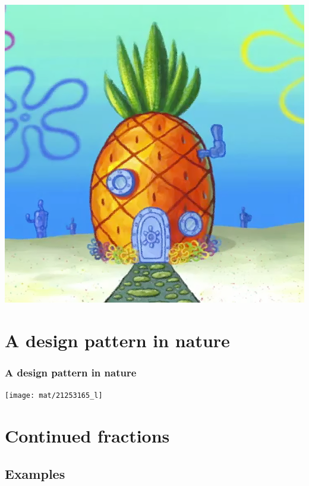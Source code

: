 \documentclass[12pt,compress,english,utf8,t]{beamer}
\begin{document}
{\begin{center}
    \includegraphics[height=0.25\textheight]{spongebob-ananas}
  \end{center}
}


\section{A design pattern in nature}

\begin{frame}\frametitle{A design pattern in nature}
  \begin{center}
    \texttt{[image: mat/21253165\_l]}

  \end{center}
\end{frame}


\section{Continued fractions}

\subsection{Examples}
\end{document}
